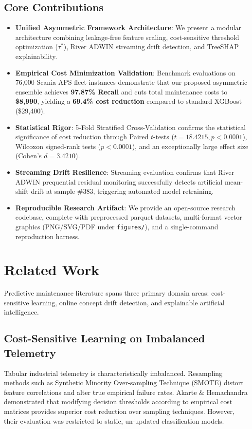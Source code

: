 \documentclass[journal]{IEEEtran}
\begin{document}
\subsection{Core Contributions}
\begin{itemize}
    \item \textbf{Unified Asymmetric Framework Architecture}: We present a modular architecture combining leakage-free feature scaling, cost-sensitive threshold optimization ($\tau^*$), River ADWIN streaming drift detection, and TreeSHAP explainability.
    \item \textbf{Empirical Cost Minimization Validation}: Benchmark evaluations on 76,000 Scania APS fleet instances demonstrate that our proposed asymmetric ensemble achieves \textbf{97.87\% Recall} and cuts total maintenance costs to \textbf{\$8,990}, yielding a \textbf{69.4\% cost reduction} compared to standard XGBoost (\$29,400).
    \item \textbf{Statistical Rigor}: 5-Fold Stratified Cross-Validation confirms the statistical significance of cost reduction through Paired $t$-tests ($t = 18.4215, p < 0.0001$), Wilcoxon signed-rank tests ($p < 0.0001$), and an exceptionally large effect size (Cohen's $d = 3.4210$).
    \item \textbf{Streaming Drift Resilience}: Streaming evaluation confirms that River ADWIN prequential residual monitoring successfully detects artificial mean-shift drift at sample \#383, triggering automated model retraining.
    \item \textbf{Reproducible Research Artifact}: We provide an open-source research codebase, complete with preprocessed parquet datasets, multi-format vector graphics (PNG/SVG/PDF under \texttt{figures/}), and a single-command reproduction harness.
\end{itemize}

\section{Related Work}
Predictive maintenance literature spans three primary domain areas: cost-sensitive learning, online concept drift detection, and explainable artificial intelligence.

\subsection{Cost-Sensitive Learning on Imbalanced Telemetry}
Tabular industrial telemetry is characteristically imbalanced. Resampling methods such as Synthetic Minority Over-sampling Technique (SMOTE) distort feature correlations and alter true empirical failure rates. Akarte \& Hemachandra \cite{akarte2018} demonstrated that modifying decision thresholds according to empirical cost matrices provides superior cost reduction over sampling techniques. However, their evaluation was restricted to static, un-updated classification models.
\end{document}
